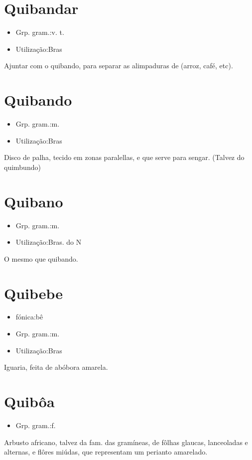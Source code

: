 \section{Quibandar}
\begin{itemize}
\item {Grp. gram.:v. t.}
\end{itemize}
\begin{itemize}
\item {Utilização:Bras}
\end{itemize}
Ajuntar com o quibando, para separar as alimpaduras de (arroz, café, etc).
\section{Quibando}
\begin{itemize}
\item {Grp. gram.:m.}
\end{itemize}
\begin{itemize}
\item {Utilização:Bras}
\end{itemize}
Disco de palha, tecido em zonas paralellas, e que serve para sengar.
(Talvez do quimbundo)
\section{Quibano}
\begin{itemize}
\item {Grp. gram.:m.}
\end{itemize}
\begin{itemize}
\item {Utilização:Bras. do N}
\end{itemize}
O mesmo que \textunderscore quibando\textunderscore .
\section{Quibebe}
\begin{itemize}
\item {fónica:bê}
\end{itemize}
\begin{itemize}
\item {Grp. gram.:m.}
\end{itemize}
\begin{itemize}
\item {Utilização:Bras}
\end{itemize}
Iguaria, feita de abóbora amarela.
\section{Quibôa}
\begin{itemize}
\item {Grp. gram.:f.}
\end{itemize}
Arbusto africano, talvez da fam. das gramíneas, de fôlhas glaucas, lanceoladas e alternas, e flôres miúdas, que representam um perianto amarelado.
